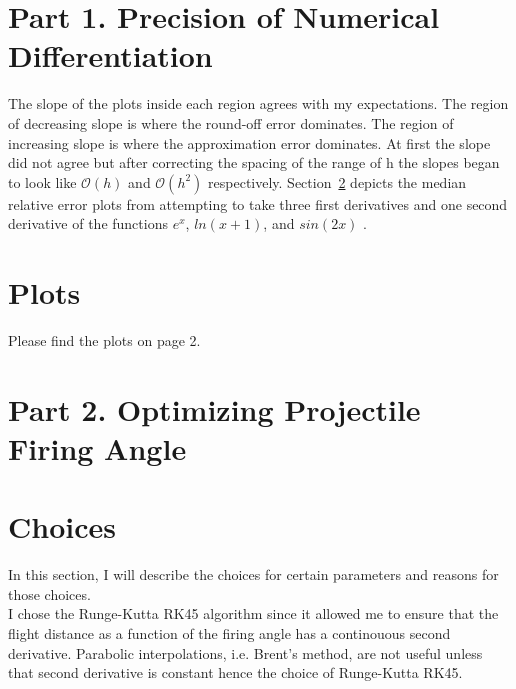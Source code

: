 \documentclass[12pt]{article}
\begin{document}
\maketitle

\section{Part 1. Precision of Numerical Differentiation}
The slope of the plots inside each region agrees with my expectations. The region of decreasing slope is where the round-off error dominates. The region of increasing slope is where the approximation error dominates. At first the slope did not agree but after correcting the spacing of the range of h the slopes began to look like $\mathcal{O}(h)$ and $\mathcal{O}(h^2)$ respectively. Section~\ref{plots} depicts the median relative error plots from attempting to take three first derivatives and one second derivative of the functions $e^x$, $ln(x+1)$, and $sin(2x)$ .

\section{Plots}\label{plots}
Please find the plots on page 2. \\

\section{Part 2. Optimizing Projectile Firing Angle}

\section{Choices}\label{choices}
In this section, I will describe the choices for certain parameters and reasons for those choices. \\
I chose the Runge-Kutta RK45 algorithm since it allowed me to ensure that the flight distance as a function of the firing angle has a continouous second derivative. Parabolic interpolations, i.e. Brent's method, are not useful unless that second derivative is constant hence the choice of Runge-Kutta RK45.
\end{document}
